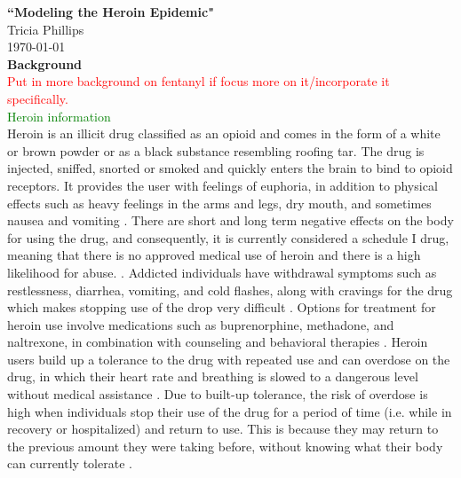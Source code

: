 \documentclass[12pt]{article}
\begin{document}
\textbf{``Modeling the Heroin Epidemic"} \\
Tricia Phillips \\
\today \\


\textbf{Background} \\
\textcolor{red}{Put in more background on fentanyl if focus more on it/incorporate it specifically.} \\
\textcolor{green}{Heroin information} \\
Heroin is an illicit drug classified as an opioid and comes in the form of a white or brown powder or as a black substance resembling roofing tar. The drug is injected, sniffed, snorted or smoked and quickly enters the brain to bind to opioid receptors. It provides the user with feelings of euphoria, in addition to physical effects such as heavy feelings in the arms and legs, dry mouth, and sometimes nausea and vomiting \cite{NIH1, NIDA2}. There are short and long term negative effects on the body for using the drug, and consequently, it is currently considered a schedule I drug, meaning that there is no approved medical use of heroin and there is a high likelihood for abuse. \cite{DEA1, NIH1}. Addicted individuals have withdrawal symptoms such as restlessness, diarrhea, vomiting, and cold flashes, along with cravings for the drug which makes stopping use of the drop very difficult \cite{NIH1}. Options for treatment for heroin use involve medications such as buprenorphine, methadone, and naltrexone, in combination with counseling and behavioral therapies \cite{SAMSHA1, NIH1}. Heroin users build up a tolerance to the drug with repeated use and can overdose on the drug, in which their heart rate and breathing is slowed to a dangerous level without medical assistance \cite{NIDA2, NIH1}. Due to built-up tolerance, the risk of overdose is high when individuals stop their use of the drug for a period of time (i.e. while in recovery or hospitalized) and return to use. This is because they may return to the previous amount they were taking before, without knowing what their body can currently tolerate \cite{NIH2}.  
\end{document}
